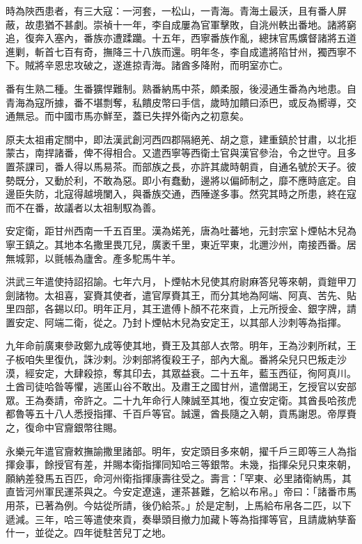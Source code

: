 \begin{pinyinscope}
時為陜西患者，有三大寇：一河套，一松山，一青海。青海土最沃，且有番人屏蔽，故患猶不甚劇。崇禎十一年，李自成屢為官軍擊敗，自洮州軼出番地。諸將窮追，復奔入塞內，番族亦遭蹂躪。十五年，西寧番族作亂，總抹官馬爌督諸將五道進剿，斬首七百有奇，撫降三十八族而還。明年冬，李自成遣將陷甘州，獨西寧不下。賊將辛恩忠攻破之，遂進掠青海。諸酋多降附，而明室亦亡。

番有生熟二種。生番獷悍難制。熟番納馬中茶，頗柔服，後浸通生番為內地患。自青海為寇所據，番不堪剽奪，私饋皮幣曰手信，歲時加饋曰添巴，或反為嚮導，交通無忌。而中國市馬亦鮮至，蓋已失捍外衛內之初意矣。

原夫太祖甫定關中，即法漢武創河西四郡隔絕羌、胡之意，建重鎮於甘肅，以北拒蒙古，南捍諸番，俾不得相合。又遣西寧等西衛土官與漢官參治，令之世守。且多置茶課司，番人得以馬易茶。而部族之長，亦許其歲時朝貢，自通名號於天子。彼勢既分，又動於利，不敢為惡。即小有蠢動，邊將以偏師制之，靡不應時底定。自邊臣失防，北寇得越境闌入，與番族交通，西陲遂多事。然究其時之所患，終在寇而不在番，故議者以太祖制馭為善。

安定衛，距甘州西南一千五百里。漢為婼羌，唐為吐蕃地，元封宗室卜煙帖木兒為寧王鎮之。其地本名撒里畏兀兒，廣袤千里，東近罕東，北邇沙州，南接西番。居無城郭，以氈帳為廬舍。產多駝馬牛羊。

洪武三年遣使持詔招諭。七年六月，卜煙帖木兒使其府尉麻答兒等來朝，貢鎧甲刀劍諸物。太祖喜，宴賚其使者，遣官厚賚其王，而分其地為阿端、阿真、苦先、貼里四部，各錫以印。明年正月，其王遣傅卜顏不花來貢，上元所授金、銀字牌，請置安定、阿端二衛，從之。乃封卜煙帖木兒為安定王，以其部人沙刺等為指揮。

九年命前廣東參政鄭九成等使其地，賚王及其部人衣幣。明年，王為沙剌所弒，王子板咱失里復仇，誅沙剌。沙剌部將復殺王子，部內大亂。番將朵兒只巴叛走沙漠，經安定，大肆殺掠，奪其印去，其眾益衰。二十五年，藍玉西征，徇阿真川。土酋司徒哈昝等懼，逃匿山谷不敢出。及肅王之國甘州，遣僧謁王，乞授官以安部眾。王為奏請，帝許之。二十九年命行人陳誠至其地，復立安定衛。其酋長哈孩虎都魯等五十八人悉授指揮、千百戶等官。誠還，酋長隨之入朝，貢馬謝恩。帝厚賚之，復命中官齎銀幣往賜。

永樂元年遣官齎敕撫諭撒里諸部。明年，安定頭目多來朝，擢千戶三即等三人為指揮僉事，餘授官有差，并賜本衛指揮同知哈三等銀幣。未幾，指揮朵兒只束來朝，願納差發馬五百匹，命河州衛指揮康壽往受之。壽言：「罕東、必里諸衛納馬，其直皆河州軍民運茶與之。今安定遼遠，運茶甚難，乞給以布帛。」帝曰：「諸番市馬用茶，已著為例。今姑從所請，後仍給茶。」於是定制，上馬給布帛各二匹，以下遞減。三年，哈三等遣使來貢，奏舉頭目撤力加藏卜等為指揮等官，且請歲納孳畜什一，並從之。四年徙駐苦兒丁之地。


\end{pinyinscope}
